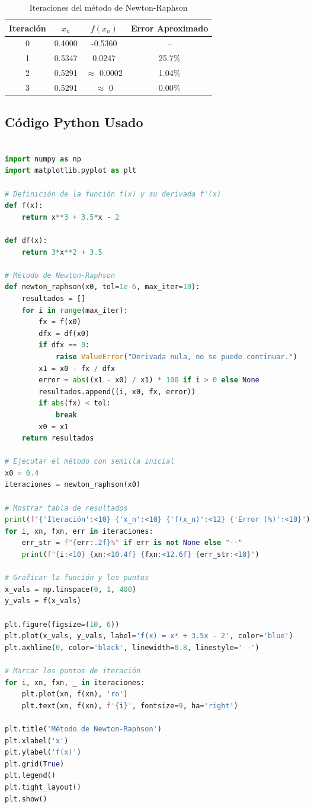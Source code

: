 \documentclass[12pt]{article}
\begin{document}
\begin{table}[H]
\centering
\begin{tabular}{@{}cccc@{}}
\toprule
\textbf{Iteración} & \textbf{$x_n$} & \textbf{$f(x_n)$} & \textbf{Error Aproximado} \\
\midrule
0 & 0.4000 & -0.5360 & -- \\
1 & 0.5347 & 0.0247 & 25.7\% \\
2 & 0.5291 & $\approx$ 0.0002 & 1.04\% \\
3 & 0.5291 & $\approx$ 0 & 0.00\% \\
\bottomrule
\end{tabular}
\caption{Iteraciones del método de Newton-Raphson}
\end{table}

\subsection*{Código Python Usado}

\begin{tcolorbox}[colback=gray!10, colframe=black!70, title=Código en Python]
\begin{lstlisting}[language=Python]

import numpy as np
import matplotlib.pyplot as plt

# Definición de la función f(x) y su derivada f'(x)
def f(x):
    return x**3 + 3.5*x - 2

def df(x):
    return 3*x**2 + 3.5

# Método de Newton-Raphson
def newton_raphson(x0, tol=1e-6, max_iter=10):
    resultados = []
    for i in range(max_iter):
        fx = f(x0)
        dfx = df(x0)
        if dfx == 0:
            raise ValueError("Derivada nula, no se puede continuar.")
        x1 = x0 - fx / dfx
        error = abs((x1 - x0) / x1) * 100 if i > 0 else None
        resultados.append((i, x0, fx, error))
        if abs(fx) < tol:
            break
        x0 = x1
    return resultados

# Ejecutar el método con semilla inicial
x0 = 0.4
iteraciones = newton_raphson(x0)

# Mostrar tabla de resultados
print(f"{'Iteración':<10} {'x_n':<10} {'f(x_n)':<12} {'Error (%)':<10}")
for i, xn, fxn, err in iteraciones:
    err_str = f"{err:.2f}%" if err is not None else "--"
    print(f"{i:<10} {xn:<10.4f} {fxn:<12.6f} {err_str:<10}")

# Graficar la función y los puntos
x_vals = np.linspace(0, 1, 400)
y_vals = f(x_vals)

plt.figure(figsize=(10, 6))
plt.plot(x_vals, y_vals, label='f(x) = x³ + 3.5x - 2', color='blue')
plt.axhline(0, color='black', linewidth=0.8, linestyle='--')

# Marcar los puntos de iteración
for i, xn, fxn, _ in iteraciones:
    plt.plot(xn, f(xn), 'ro')
    plt.text(xn, f(xn), f'{i}', fontsize=9, ha='right')

plt.title('Método de Newton-Raphson')
plt.xlabel('x')
plt.ylabel('f(x)')
plt.grid(True)
plt.legend()
plt.tight_layout()
plt.show()


\end{lstlisting}
\end{tcolorbox}
\end{document}
